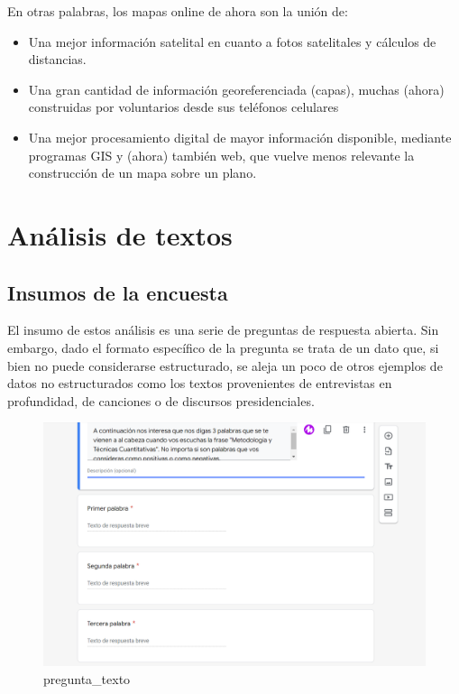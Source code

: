 \documentclass[
  letterpaper,
  DIV=11,
  numbers=noendperiod]{scrreprt}
\begin{document}
En otras palabras, los mapas online de ahora son la unión de:

\begin{itemize}
\item
  Una mejor información satelital en cuanto a fotos satelitales y
  cálculos de distancias.
\item
  Una gran cantidad de información georeferenciada (capas), muchas
  (ahora) construidas por voluntarios desde sus teléfonos celulares
\item
  Una mejor procesamiento digital de mayor información disponible,
  mediante programas GIS y (ahora) también web, que vuelve menos
  relevante la construcción de un mapa sobre un plano.
\end{itemize}


\hypertarget{anuxe1lisis-de-textos}{%
\chapter{Análisis de textos}\label{anuxe1lisis-de-textos}}

\hypertarget{insumos-de-la-encuesta-1}{%
\section{Insumos de la encuesta}\label{insumos-de-la-encuesta-1}}

El insumo de estos análisis es una serie de preguntas de respuesta
abierta. Sin embargo, dado el formato específico de la pregunta se trata
de un dato que, si bien no puede considerarse estructurado, se aleja un
poco de otros ejemplos de datos no estructurados como los textos
provenientes de entrevistas en profundidad, de canciones o de discursos
presidenciales.

\begin{figure}

{\centering \includegraphics[width=6.25in,height=\textheight]{./Inputs/Images/preguntas_texto.png}

}

\caption{pregunta\_texto}

\end{figure}
\end{document}

